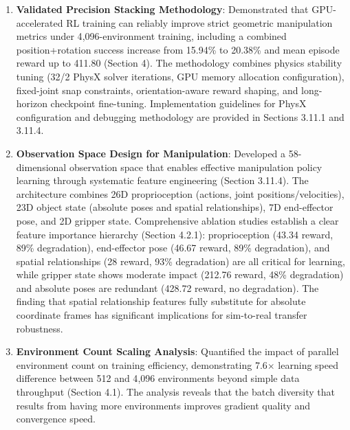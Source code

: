 \documentclass[12pt,a4paper,oneside]{report}
\begin{document}
\begin{enumerate}
    \item \textbf{Validated Precision Stacking Methodology}: Demonstrated that GPU-accelerated RL training can reliably improve strict geometric manipulation metrics under 4{,}096-environment training, including a combined position+rotation success increase from 15.94\% to 20.38\% and mean episode reward up to 411.80 (Section 4). The methodology combines physics stability tuning (32/2 PhysX solver iterations, GPU memory allocation configuration), fixed-joint snap constraints, orientation-aware reward shaping, and long-horizon checkpoint fine-tuning. Implementation guidelines for PhysX configuration and debugging methodology are provided in Sections 3.11.1 and 3.11.4.

    \item \textbf{Observation Space Design for Manipulation}: Developed a 58-dimensional observation space that enables effective manipulation policy learning through systematic feature engineering (Section 3.11.4). The architecture combines 26D proprioception (actions, joint positions/velocities), 23D object state (absolute poses and spatial relationships), 7D end-effector pose, and 2D gripper state. Comprehensive ablation studies establish a clear feature importance hierarchy (Section 4.2.1): proprioception (43.34 reward, 89\% degradation), end-effector pose (46.67 reward, 89\% degradation), and spatial relationships (28 reward, 93\% degradation) are all critical for learning, while gripper state shows moderate impact (212.76 reward, 48\% degradation) and absolute poses are redundant (428.72 reward, no degradation). The finding that spatial relationship features fully substitute for absolute coordinate frames has significant implications for sim-to-real transfer robustness.

    \item \textbf{Environment Count Scaling Analysis}: Quantified the impact of parallel environment count on training efficiency, demonstrating 7.6$\times$ learning speed difference between 512 and 4{,}096 environments beyond simple data throughput (Section 4.1). The analysis reveals that the batch diversity that results from having more environments improves gradient quality and convergence speed.


\end{enumerate}
\end{document}

